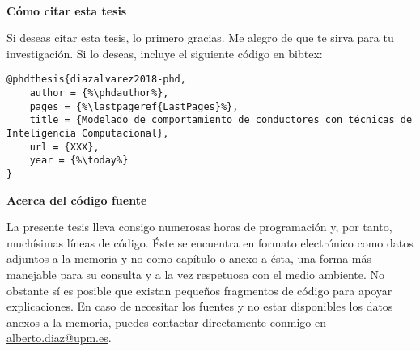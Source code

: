 \cleardoublepage
\begin{fullwidth}
~\vfill
\thispagestyle{empty}
\setlength{\parindent}{0pt}
\setlength{\parskip}{\baselineskip}

\par{
	\textbf{Cómo citar esta tesis}
	
	Si deseas citar esta tesis, lo primero gracias. Me alegro de que te sirva para tu investigación. Si lo deseas, incluye el siguiente código en bibtex:
	
	\begin{lstlisting}[escapechar=\%]
@phdthesis{diazalvarez2018-phd,
	author = {%\phdauthor%},
	pages = {%\lastpageref{LastPages}%},
	title = {Modelado de comportamiento de conductores con técnicas de Inteligencia Computacional},
	url = {XXX},
	year = {%\today%}
}
	\end{lstlisting}
}

\par{
	\textbf{Acerca del código fuente}
	
	La presente tesis lleva consigo numerosas horas de programación y, por tanto, muchísimas líneas de código. Éste se encuentra en formato electrónico como datos adjuntos a la memoria y no como capítulo o anexo a ésta, una forma más manejable para su consulta y a la vez respetuosa con el medio ambiente. No obstante sí es posible que existan pequeños fragmentos de código para apoyar explicaciones. En caso de necesitar los fuentes y no estar disponibles los datos anexos a la memoria, puedes contactar directamente conmigo en \url{alberto.diaz@upm.es}.
}

\end{fullwidth}

